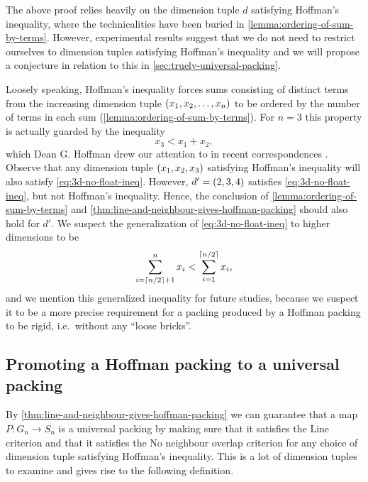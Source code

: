 \noindent The above proof relies heavily on the dimension tuple $d$ satisfying Hoffman's inequality, where the technicalities have been buried in \cref{lemma:ordering-of-sum-by-terms}. However, experimental results suggest that we do not need to restrict ourselves to dimension tuples satisfying Hoffman's inequality and we will propose a conjecture in relation to this in \cref{sec:truely-universal-packing}.

\begin{remark}
Loosely speaking, Hoffman's inequality forces sums consisting of distinct terms from the increasing dimension tuple $\paren{x_1, x_2, \dotsc, x_n}$ to be ordered by the number of terms in each sum (\cref{lemma:ordering-of-sum-by-terms}). For $n = 3$ this property is actually guarded by the inequality
\begin{equation}\label{eq:3d-no-float-ineq}
    x_3 < x_1 + x_2,
\end{equation}
which Dean G. Hoffman drew our attention to in recent correspondences \cite{hoffman_private}. Observe that any dimension tuple $\paren{x_1, x_2, x_3}$ satisfying Hoffman's inequality will also satisfy \eqref{eq:3d-no-float-ineq}. However, $d' = \paren{2, 3, 4}$ satisfies \eqref{eq:3d-no-float-ineq}, but not Hoffman's inequality. Hence, the conclusion of \cref{lemma:ordering-of-sum-by-terms} and \cref{thm:line-and-neighbour-gives-hoffman-packing} should also hold for $d'$. We suspect the generalization of \eqref{eq:3d-no-float-ineq} to higher dimensions to be
\[
\sum_{i = \ceil*{n/2}+1}^{n} x_i < \sum_{i = 1}^{\ceil*{n/2}} x_i,
\]
and we mention this generalized inequality for future studies, because we suspect it to be a more precise requirement for a packing produced by a Hoffman packing to be rigid, i.e.\ without any ``loose bricks''.
\end{remark}

\subsection{Promoting a Hoffman packing to a universal packing}
By \cref{thm:line-and-neighbour-gives-hoffman-packing} we can guarantee that a map $P\colon G_n \to S_n$ is a universal packing by making sure that it satisfies the Line criterion  and that it satisfies the No neighbour overlap criterion  for any choice of dimension tuple satisfying Hoffman's inequality. This is a lot of dimension tuples to examine and gives rise to the following definition.

